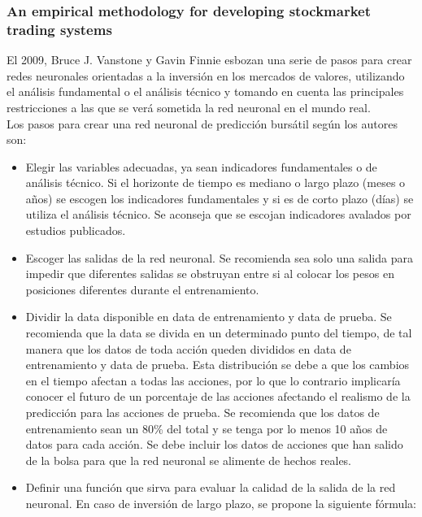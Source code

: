 \subsubsection{An empirical methodology for developing stockmarket trading systems}

El 2009, Bruce J. Vanstone y Gavin Finnie \cite{Vanstone2009} esbozan una serie de pasos para crear redes neuronales orientadas a la inversión en los mercados de valores, utilizando el análisis fundamental o el análisis técnico y tomando en cuenta las principales restricciones a las que se verá sometida la red neuronal en el mundo real.\\

Los pasos para crear una red neuronal de predicción bursátil según los autores son:

\begin{itemize}
\item Elegir las variables adecuadas, ya sean indicadores fundamentales o de análisis técnico. Si el horizonte de tiempo es mediano o largo plazo (meses o años) se escogen los indicadores fundamentales y si es de corto plazo (días) se utiliza el análisis técnico. Se aconseja que se escojan indicadores avalados por estudios publicados.

\item Escoger las salidas de la red neuronal. Se recomienda sea solo una salida para impedir que diferentes salidas se obstruyan entre si al colocar los pesos en posiciones diferentes durante el entrenamiento.

\item Dividir la data disponible en data de entrenamiento y data de prueba. Se recomienda que la data se divida en un determinado punto del tiempo, de tal manera que los datos de toda acción queden divididos en data de entrenamiento y data de prueba. Esta distribución se debe a que los cambios en el tiempo afectan a todas las acciones, por lo que lo contrario implicaría conocer el futuro de un porcentaje de las acciones afectando el realismo de la predicción para las acciones de prueba. Se recomienda que los datos de entrenamiento sean un 80\% del total y se tenga por lo menos 10 años de datos para cada acción. Se debe incluir los datos de acciones que han salido de la bolsa para que la red neuronal se alimente de hechos reales.

\item Definir una función que sirva para evaluar la calidad de la salida de la red neuronal. En caso de inversión de largo plazo, se propone la siguiente fórmula:


\end{itemize}

